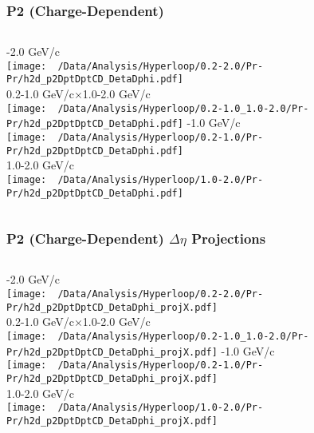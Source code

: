 \documentclass{beamer}
\begin{document}
\begin{frame}
	\frametitle{P2 (Charge-Dependent)}
	\begin{columns}
		-2.0 GeV/c\\
		\texttt{[image: ~/Data/Analysis/Hyperloop/0.2-2.0/Pr-Pr/h2d\_p2DptDptCD\_DetaDphi.pdf]}\\0.2-1.0 GeV/c$\times$1.0-2.0 GeV/c\\
		\texttt{[image: ~/Data/Analysis/Hyperloop/0.2-1.0\_1.0-2.0/Pr-Pr/h2d\_p2DptDptCD\_DetaDphi.pdf]}
		-1.0 GeV/c\\
		\texttt{[image: ~/Data/Analysis/Hyperloop/0.2-1.0/Pr-Pr/h2d\_p2DptDptCD\_DetaDphi.pdf]}\\1.0-2.0 GeV/c\\
		\texttt{[image: ~/Data/Analysis/Hyperloop/1.0-2.0/Pr-Pr/h2d\_p2DptDptCD\_DetaDphi.pdf]}
	\end{columns}
\end{frame}
\begin{frame}
	\frametitle{P2 (Charge-Dependent) $\Delta\eta$ Projections}
	\begin{columns}
		\column{0.5\textwidth}
		-2.0 GeV/c\\
		\texttt{[image: ~/Data/Analysis/Hyperloop/0.2-2.0/Pr-Pr/h2d\_p2DptDptCD\_DetaDphi\_projX.pdf]}\\0.2-1.0 GeV/c$\times$1.0-2.0 GeV/c\\
		\texttt{[image: ~/Data/Analysis/Hyperloop/0.2-1.0\_1.0-2.0/Pr-Pr/h2d\_p2DptDptCD\_DetaDphi\_projX.pdf]}
		\column{0.5\textwidth}
		-1.0 GeV/c\\
		\texttt{[image: ~/Data/Analysis/Hyperloop/0.2-1.0/Pr-Pr/h2d\_p2DptDptCD\_DetaDphi\_projX.pdf]}\\1.0-2.0 GeV/c\\
		\texttt{[image: ~/Data/Analysis/Hyperloop/1.0-2.0/Pr-Pr/h2d\_p2DptDptCD\_DetaDphi\_projX.pdf]}
	\end{columns}
\end{frame}
\end{document}
